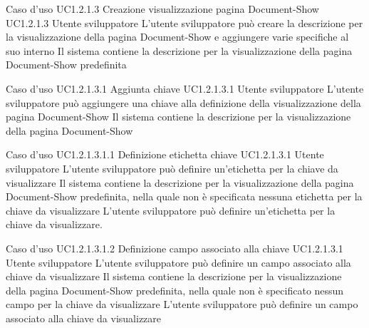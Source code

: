 \UCtitle
{Caso d'uso UC1.2.1.3}
{Creazione visualizzazione pagina Document-Show}
\UC
{UC1.2.1.3}
{Utente sviluppatore}
{L'utente sviluppatore  può creare la descrizione per la visualizzazione della pagina Document-Show e aggiungere varie specifiche al suo interno}
{Il sistema contiene la descrizione per la visualizzazione della pagina Document-Show predefinita}

\UCtitle
{Caso d'uso UC1.2.1.3.1}
{Aggiunta chiave}
\UC
{UC1.2.1.3.1}
{Utente sviluppatore}
{L'utente sviluppatore può aggiungere una chiave alla definizione della visualizzazione della pagina Document-Show}
{Il sistema contiene la descrizione per la visualizzazione della pagina Document-Show}

\UCtitle
{Caso d'uso UC1.2.1.3.1.1}
{Definizione etichetta chiave}
\UC
{UC1.2.1.3.1}
{Utente sviluppatore}
{L'utente sviluppatore può definire un'etichetta per la chiave da visualizzare}
{Il sistema contiene la descrizione per la visualizzazione della pagina Document-Show predefinita, nella quale non è specificata nessuna etichetta per la chiave da visualizzare}
\scenario
{L'utente sviluppatore può definire un'etichetta per la chiave da visualizzare.}

\UCtitle
{Caso d'uso UC1.2.1.3.1.2}
{Definizione campo associato alla chiave}
\UC
{UC1.2.1.3.1}
{Utente sviluppatore}
{L'utente sviluppatore può definire un campo associato alla chiave da visualizzare}
{Il sistema contiene la descrizione per la visualizzazione della pagina Document-Show predefinita, nella quale non è specificato nessun campo per la chiave da visualizzare}
\scenario
{L'utente sviluppatore può definire un campo associato alla chiave da visualizzare}

